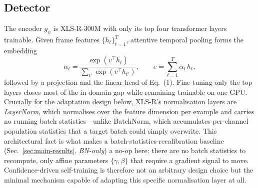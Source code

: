 \documentclass[conference]{IEEEtran}
\begin{document}
\subsection{Detector}
The encoder $g_\psi$ is XLS-R-300M with only its top four transformer layers
trainable. Given frame features $\{h_t\}_{t=1}^{T}$, attentive temporal pooling
forms the embedding
\begin{equation}
\alpha_t=\frac{\exp(v^\top h_t)}{\sum_{t'}\exp(v^\top h_{t'})},\qquad
e=\sum_{t=1}^{T}\alpha_t\,h_t,
\end{equation}
followed by a projection and the linear head of Eq.~(1). Fine-tuning only the top
layers closes most of the in-domain gap while remaining trainable on one GPU.
Crucially for the adaptation design below, XLS-R's normalisation layers are
\emph{LayerNorm}, which normalises over the feature dimension per example and
carries no running batch statistics---unlike BatchNorm, which accumulates
per-channel population statistics that a target batch could simply overwrite.
This architectural fact is what makes a batch-statistics-recalibration
baseline (Sec.~\ref{sec:main-results}, \emph{BN-only}) a no-op here: there are
no batch statistics to recompute, only affine parameters $\{\gamma,\beta\}$
that require a gradient signal to move. Confidence-driven self-training is
therefore not an arbitrary design choice but the minimal mechanism capable of
adapting this specific normalisation layer at all.
\end{document}
